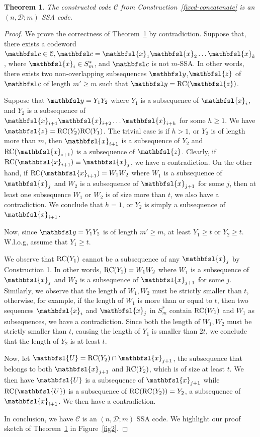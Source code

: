 \documentclass[conference]{IEEEtran}
\DeclarePairedDelimiter\ceil{\lceil}{\rceil}
\theoremstyle{plain}
\newtheorem{theorem}{Theorem}
\theoremstyle{definition}
\newcommand{\C}{{\mathcal C}}
\newcommand{\D}{{\mathcal D}}
\newcommand{\bU}{\mathbfsl{U}}
\newcommand{\by}{{\mathbfsl y}}
\newcommand{\bc}{{\mathbfsl c}}
\newcommand{\bx}{{\mathbfsl{x}}}
\newcommand{\bz}{{\mathbfsl{z}}}
\renewcommand{\ge}{\geqslant}
\begin{document}
\begin{theorem}\label{con1}
The constructed code $\C$ from Construction~\ref{fixed-concatenate} is an $(n,\D;m)$ SSA code. 
\end{theorem} 

\begin{proof}
We prove the correctness of Theorem~\ref{con1} by contradiction. Suppose that, there exists a codeword $\bc\in \C, \bc=\bx_1\bx_2\ldots \bx_k$, where $\bx_i \in S_m^*$, and $\bc$ is not $m$-SSA. In other words, there exists two non-overlapping subsequences $\by$,$\bz$ of $\bc$ of length $m'\ge m$ such that $\by={\rm RC}(\bz)$. 

Suppose that $\by=Y_1 Y_2$ where $Y_1$ is a subsequence of $\bx_i$, and $Y_2$ is a subsequence of $\bx_{i+1}\bx_{i+2}\ldots \bx_{i+h}$ for some $h\ge 1$. We have $\bz={\rm RC}(Y_2) {\rm RC}(Y_1)$. The trivial case is if $h>1$, or $Y_2$ is of length more than $m$, then $\bx_{i+1}$ is a subsequence of $Y_2$ and $ {\rm RC}(\bx_{i+1})$ is a subsequence of $\bz$. Clearly, if $ {\rm RC}(\bx_{i+1}) \equiv \bx_j$, we have a contradiction. On the other hand, if $ {\rm RC}(\bx_{i+1})=W_1 W_2$ where $W_1$ is a subsequence of $\bx_j$ and $W_2$ is a subsequence of $\bx_{j+1}$ for some $j$, then at least one subsequence $W_1$ or $W_2$ is of size more than $t$, we also have a contradiction. We conclude that $h=1$, or $Y_2$ is simply a subsequence of $\bx_{i+1}$.

Now, since $\by=Y_1Y_2$ is of length $m'\ge m$, at least $Y_1\ge t$ or $Y_2\ge t$. W.l.o.g, assume that  $Y_1\ge t$.

We observe that ${\rm RC}(Y_1)$ cannot be a subsequence of any $\bx_j$ by Construction 1. In other words, ${\rm RC}(Y_1)=W_1 W_2$ where $W_1$ is a subsequence of $\bx_j$ and $W_2$ is a subsequence of $\bx_{j+1}$ for some $j$. Similarly, we observe that the length of $W_1, W_2$ must be strictly smaller than $t$, otherwise, for example, if the length of $W_1$ is more than or equal to $t$, then two sequences $\bx_i$ and $\bx_j$ in $S_m^*$ contain ${\rm RC}(W_1)$ and $W_1$ as subsequences, we have a contradiction. Since both the length of $W_1, W_2$ must be strictly smaller than $t$, causing the length of $Y_1$ is smaller than $2t$, we conclude that the length of $Y_2$ is at least $t$. 

Now, let $\bU={\rm RC}(Y_2) \cap \bx_{j+1}$, the subsequence that belongs to both $\bx_{j+1}$ and ${\rm RC}(Y_2)$, which is of size at least $t$. We then have $\bU$ is a subsequence of $\bx_{j+1}$ while ${\rm RC}(\bU)$ is a subsequence of ${\rm RC}({\rm RC}(Y_2))=Y_2$, a subsequence of $\bx_{i+1}$. We then have a contradiction. 

In conclusion, we have $\C$ is an $(n,\D;m)$ SSA code. We highlight our proof sketch of Theorem~\ref{con1} in Figure~\ref{fig2}.
\end{proof}
\end{document}
